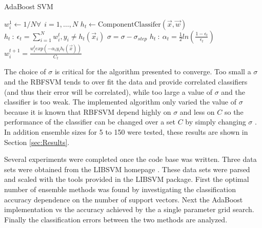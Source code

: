 \begin{algorithm}
\caption{AdaBoost SVM}
\label{algo:AdaBoostSVM}
\begin{algorithmic}[1]
\State $w_{i}^{1} \gets 1/N \forall ~~ i=1,\dots,N$
    \label{marker}
    \State $h_t \gets \text{ComponentClassifer}(\vec{x},\vec{w})$
    \State $h_t~:~\epsilon_t = \sum_{i=1}^{N}w_{i}^{t} , y_i \ne h_t(\vec{x}_i)$
        \State $\sigma = \sigma - \sigma_{step}$
        \State {}
    \EndIf
    \State $h_t~:~\alpha_t = \frac{1}{2} ln\left ( \frac{1-\epsilon_t}{\epsilon_t}\right)$
    \State $w_i^{t+1} = \frac{w_i^{t} exp\left ( -\alpha_i y_i h_t(\vec{x})\right)}{C_t}$
\EndWhile
\Statex
{}
\EndProcedure
\end{algorithmic}
\end{algorithm}

The choice of $\sigma$ is critical for the algorithm presented to converge.
Too small a $\sigma$ and the RBFSVM tends to over fit the data and provide correlated classifiers (and thus their error will be correlated), while too large a value of $\sigma$ and the classifier is too weak.
The implemented algorithm only varied the value of $\sigma$ because it is known that RBFSVM depend highly on $\sigma$ and less on $C$ so the performance of the classifier can be changed over a set $C$ by simply changing $\sigma$ \cite{li_adaboost_2008}.
In addition ensemble sizes for 5 to 150 were tested, these results are shown in Section \ref{sec:Results}.

Several experiments were completed once the code base was written.
Three data sets were obtained from the LIBSVM homepage \cite{chang_libsvm:_2011}.
These data sets were parsed and scaled with the tools provided in the LIBSVM package.
First the optimal number of ensemble methods was found by investigating the classification accuracy dependence on the number of support vectors.
Next the AdaBoost implementation vs the accuracy achieved by the a single parameter grid search.
Finally the classification errors between the two methods are analyzed.
